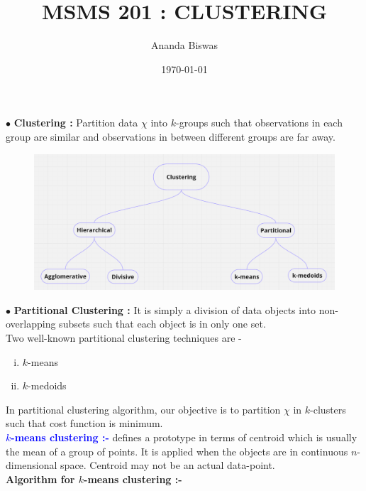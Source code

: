 \documentclass[11pt, a4paper]{article}
\title{MSMS 201 : CLUSTERING}
\author{Ananda Biswas}
\date{\today}
\begin{document}
\maketitle

$\bullet$ \textbf{Clustering :} Partition data $\chi$ into $k$-groups such that observations in each group are similar and observations in between different groups are far away.

\begin{figure}[!htbp]
\centering
\includegraphics[scale=0.4]{image1.png}
\end{figure}

$\bullet$ \textbf{Partitional Clustering :} It is simply a division of data objects into non-overlapping subsets such that each object is in only one set. \\

Two well-known partitional clustering techniques are -

\begin{enumerate}[(i)]
\item $k$-means
\item $k$-medoids
\end{enumerate}

In partitional clustering algorithm, our objective is to partition $\chi$ in $k$-clusters such that cost function is minimum. \\

\leftpointright \hspace{0.2cm} \textbf{\textcolor{blue}{$k$-means clustering :-}} defines a prototype in terms of centroid which is usually the mean of a group of points. It is applied when the objects are in continuous $n$-dimensional space. Centroid may not be an actual data-point. \\

\faArrowAltCircleRight[regular] \hspace{0.2cm} \textbf{Algorithm for $k$-means clustering :-} \\
\end{document}
